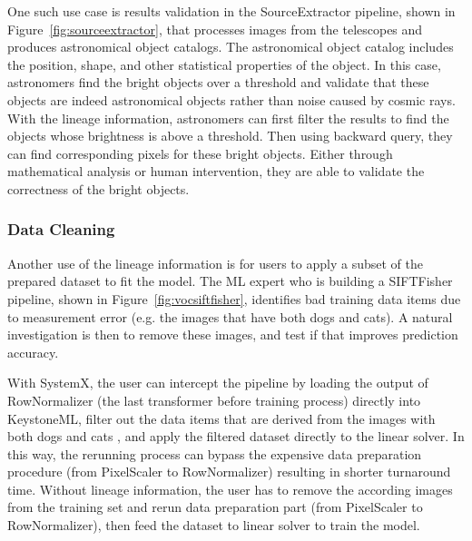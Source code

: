\documentclass{sig-alternate}
\begin{document}
One such use case is results validation in the SourceExtractor pipeline, shown in Figure~\ref{fig:sourceextractor},
that processes images from the telescopes and produces astronomical object catalogs. 
The astronomical object catalog includes the position, shape, and other statistical properties of the object.
In this case, astronomers find the bright objects over a threshold and validate that these objects are indeed astronomical objects rather
than noise caused by cosmic rays.
With the lineage information, astronomers can first filter the results to find the objects whose brightness is above a threshold.
Then using backward query, they can find corresponding pixels for these bright objects. 
Either through mathematical analysis or human intervention, they are able to validate the correctness of the bright objects.

\subsubsection{Data Cleaning}
\label{sec:Back-Case-Cleaning}
Another use of the lineage information is for users to apply a subset of the prepared dataset to fit the model. 
The ML expert who is building a SIFTFisher pipeline, shown in Figure~\ref{fig:vocsiftfisher}, identifies bad 
training data items due to measurement error (e.g. the images that have both dogs and cats). A natural 
investigation is then to remove these images, and test if that improves prediction accuracy.

With SystemX, the user can intercept the pipeline by loading the output of RowNormalizer (the last transformer before training process) 
directly into KeystoneML, filter out the data items that are derived from the images with both dogs and cats , 
and apply the filtered dataset directly to the linear solver.
In this way, the rerunning process can bypass the expensive data preparation procedure (from PixelScaler to RowNormalizer) 
resulting in shorter turnaround time.
Without lineage information, the user has to remove the according images from the training set and rerun data
preparation part (from PixelScaler to RowNormalizer), then feed the dataset to linear solver to train the model.
\end{document}
